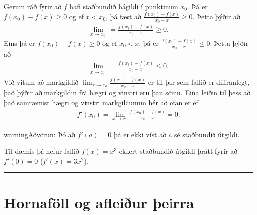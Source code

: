 \documentclass[b5paper,10pt,icelandic]{sphinxmanual}
\begin{document}
Gerum ráð fyrir að \(f\) hafi staðbundið hágildi í punktinum \(x_0\).
Þá er \(f(x_0)-f(x)\geq 0\) og ef \(x<x_0\),
þá fæst að  \(\frac{f(x_0)-f(x)}{x_0-x}\geq 0\). Þetta þýðir að
\begin{equation*}
\begin{split}\lim_{x \to x_0^-} = \frac{f(x_0) - f(x)}{x_0-x} \geq 0.
    \label{vinstri}\end{split}
\end{equation*}
Eins þá er \(f(x_0)-f(x)\geq 0\) og ef \(x_0<x\),
þá er \(\frac{f(x_0)-f(x)}{x_0-x} \leq 0\).
Þetta þýðir að
\begin{equation*}
\begin{split}\lim_{x \to x_0^+} = \frac{f(x_0) - f(x)}{x_0-x} \leq 0.
    \label{haegri}\end{split}
\end{equation*}
Við vitum að markgildið
\(\lim_{x\to x_0} \frac{f(x_0)-f(x)}{x_0-x}\) er til þar sem fallið
er diffranlegt, það þýðir að markgildin frá hægri og vinstri eru þau
sömu. Eina leiðin til þess að það samræmist hægri og vinstri markgildunum
hér að ofan er ef
\begin{equation*}
\begin{split}f'(x_0) = \lim_{x\to x_0} \frac{f(x_0)-f(x)}{x_0-x} = 0.\end{split}
\end{equation*}
\begin{DUlineblock}{0em}
\item[] 
\item[] 
\end{DUlineblock}

\begin{sphinxadmonition}{warning}{Aðvörun:}
Þó að \(f'(a)=0\) þá er ekki víst að \(a\) sé staðbundið útgildi.

Til dæmis þá hefur fallið \(f(x) = x^3\) ekkert staðbundið útgildi
þrátt fyrir að \(f'(0) = 0\) (\(f'(x) = 3x^2\)).
\end{sphinxadmonition}


\bigskip\hrule\bigskip



\section{Hornaföll og afleiður þeirra}
\label{\detokenize{kafli03:hornafoll-og-afleiur-eirra}}
\end{document}
